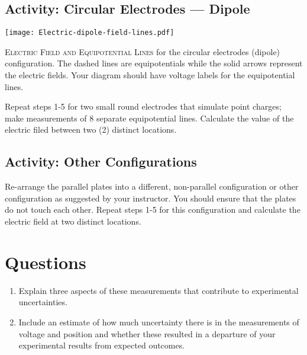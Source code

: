 \subsection{Activity: Circular Electrodes --- Dipole}
\begin{marginfigure}[-20em]
	\texttt{[image: Electric-dipole-field-lines.pdf]}
	\caption[Dipole Electric Field]{\textsc{Electric Field and Equipotential Lines} for the circular electrodes (dipole) configuration.  The dashed lines are equipotentials while the solid arrows represent the electric fields.  Your diagram should have voltage labels for the equipotential lines.}
\end{marginfigure}
Repeat steps 1-5 for two small round electrodes that simulate point charges; make measurements of 8 separate equipotential lines. Calculate the value of the electric filed between two (2) distinct locations.

\subsection{Activity: Other Configurations}
Re-arrange the parallel plates into a different, non-parallel configuration or other configuration as suggested by your instructor.  You should ensure that the plates do not touch each other.  Repeat steps 1-5 for this configuration and calculate the electric field at two distinct locations.

\section{Questions}
\begin{enumerate}
	 \item Explain three aspects of these measurements that contribute to experimental uncertainties.
	 \item Include an estimate of how much uncertainty  there is in the measurements of voltage and position and whether these resulted in a departure of your experimental results from expected outcomes. 
\end{enumerate}


\endinput
